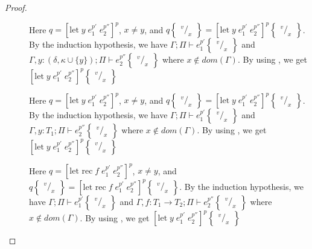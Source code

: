 \documentclass[../../master.tex]{subfiles}
\begin{document}
\begin{proof}
\begin{description}
		\item[] Here $q=[\mbox{let}\;y\;e_1^{p'}\;e_2^{p''}]^p$, $x\neq y$, and $q\begin{Bmatrix} ^v/_x \end{Bmatrix}=[\mbox{let}\;y\;e_1^{p'}\;e_2^{p''}]^p\begin{Bmatrix} ^v/_x \end{Bmatrix}$.
			By the induction hypothesis, we have $\Gamma;\Pi\vdash e_1^{p'}\begin{Bmatrix} ^v/_x \end{Bmatrix}$ and $\Gamma,y:(\delta,\kappa\cup\{y\});\Pi\vdash e_2^{p''}\begin{Bmatrix} ^v/_x \end{Bmatrix}$ where $x\notin dom(\Gamma)$.
			By using , we get $[\mbox{let}\;y\;e_1^{p'}\;e_2^{p''}]^p\begin{Bmatrix} ^v/_x \end{Bmatrix}$

		\item[] Here $q=[\mbox{let}\;y\;e_1^{p'}\;e_2^{p''}]^p$, $x\neq y$, and $q\begin{Bmatrix} ^v/_x \end{Bmatrix}=[\mbox{let}\;y\;e_1^{p'}\;e_2^{p''}]^p\begin{Bmatrix} ^v/_x \end{Bmatrix}$.
			By the induction hypothesis, we have $\Gamma;\Pi\vdash e_1^{p'}\begin{Bmatrix} ^v/_x \end{Bmatrix}$ and $\Gamma,y:T_1;\Pi\vdash e_2^{p''}\begin{Bmatrix} ^v/_x \end{Bmatrix}$ where $x\notin dom(\Gamma)$.
			By using , we get $[\mbox{let}\;y\;e_1^{p'}\;e_2^{p''}]^p\begin{Bmatrix} ^v/_x \end{Bmatrix}$

		\item[] Here $q=[\mbox{let rec}\;f\;e_1^{p'}\;e_2^{p''}]^p$, $x\neq y$, and $q\begin{Bmatrix} ^v/_x \end{Bmatrix}=[\mbox{let rec}\;f\;e_1^{p'}\;e_2^{p''}]^p\begin{Bmatrix} ^v/_x \end{Bmatrix}$.
			By the induction hypothesis, we have $\Gamma;\Pi\vdash e_1^{p'}\begin{Bmatrix} ^v/_x \end{Bmatrix}$ and $\Gamma,f:T_1\rightarrow T_2;\Pi\vdash e_2^{p''}\begin{Bmatrix} ^v/_x \end{Bmatrix}$ where $x\notin dom(\Gamma)$.
			By using , we get $[\mbox{let}\;y\;e_1^{p'}\;e_2^{p''}]^p\begin{Bmatrix} ^v/_x \end{Bmatrix}$


\end{description}
\end{proof}
\end{document}
